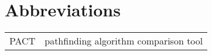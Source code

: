 \chapter*{Abbreviations} 

\begin{longtable}{rl}
PACT & pathfinding algorithm comparison tool\\
\end{longtable}